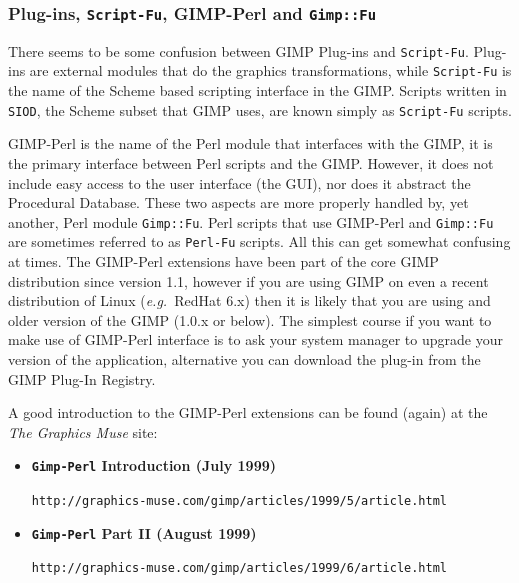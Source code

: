 \documentclass[twoside,11pt]{article}
\newcommand{\htmladdnormallink}[2]{#1}
\begin{document}
\subsubsection{Plug-ins, {\tt Script-Fu}, GIMP-Perl and {\tt Gimp::Fu}}

There seems to be some confusion between GIMP Plug-ins and {\tt Script-Fu}.  Plug-ins are external modules that do the graphics transformations, while  {\tt Script-Fu} is the name of the Scheme based scripting interface in the GIMP.  Scripts written in {\tt SIOD}, the Scheme subset that GIMP uses, are known simply as {\tt Script-Fu} scripts.

\htmladdnormallink{GIMP-Perl}{http://www.goof.com/pcg/marc/gimp.html} is the name of the Perl module that interfaces with the GIMP, it is the primary interface between Perl scripts and the GIMP. However, it does not include easy access to the user interface (the GUI), nor does it abstract the Procedural Database. These two aspects are more properly handled by, yet another, Perl module {\tt Gimp::Fu}. Perl scripts that use GIMP-Perl and {\tt Gimp::Fu} are sometimes referred to as {\tt Perl-Fu} scripts. All this can get somewhat confusing at times. The GIMP-Perl extensions have been part of the core GIMP distribution since version 1.1, however if you are using GIMP on even a recent distribution of Linux ({\em e.g.\ }RedHat 6.x) then it is likely that you are using and older version of the GIMP (1.0.x or below). The simplest course if you want to make use of GIMP-Perl interface is to ask your system manager to upgrade your version of the application, alternative you can download the plug-in from the GIMP Plug-In Registry. 

A good introduction to the GIMP-Perl extensions can be found (again) at the \htmladdnormallink{{\em The Graphics Muse}}{http://graphics-muse.com/} site:

\begin{itemize}
\item {\bf{\tt Gimp-Perl} Introduction (July 1999)}\\
\begin{small}\htmladdnormallink{{\tt http://graphics-muse.com/gimp/articles/1999/5/article.html}}{http://graphics-muse.com/gimp/articles/1999/5/article.html}\end{small}
\item {\bf{\tt Gimp-Perl} Part II (August 1999)}\\
\begin{small}\htmladdnormallink{{\tt http://graphics-muse.com/gimp/articles/1999/6/article.html}}{http://graphics-muse.com/gimp/articles/1999/6/article.html}\end{small}
\end{itemize}
\end{document}
